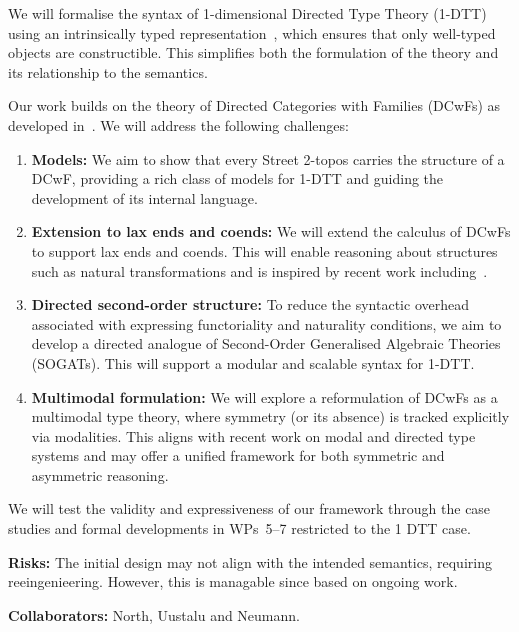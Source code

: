 \documentclass[a4paper,11pt]{article}
\begin{document}
We will formalise the syntax of 1-dimensional Directed Type Theory
(1-DTT) using an intrinsically typed
representation~\cite{altenkirch2016type}, which ensures that only
well-typed objects are constructible. This simplifies both the
formulation of the theory and its relationship to the semantics. 

Our work builds on the theory of Directed Categories with Families
(DCwFs) as developed in~\cite{altenkirch_neumann_2024}. We will address the
following challenges: 

\begin{enumerate}
\item \textbf{Models:} We aim to show that every Street 2-topos carries the structure of a DCwF, providing a rich class of models for 1-DTT and guiding the development of its internal language.

\item \textbf{Extension to lax ends and coends:} We will extend the
  calculus of DCwFs to support lax ends and coends. This will enable
  reasoning about structures such as natural transformations and is
  inspired by recent work including~\cite{north_2019}.  

\item \textbf{Directed second-order structure:} To reduce the
  syntactic overhead associated with expressing functoriality and
  naturality conditions, we aim to develop a directed analogue of
  Second-Order Generalised Algebraic Theories (SOGATs). This will support a modular
  and scalable syntax for 1-DTT. 

\item \textbf{Multimodal formulation:} We will explore a reformulation
  of DCwFs as a multimodal type theory, where symmetry (or its
  absence) is tracked explicitly via modalities. This aligns with
  recent work on modal and directed type systems and may offer a
  unified framework for both symmetric and asymmetric reasoning.
\end{enumerate}

We will test the validity and expressiveness of our 
framework through the case studies and formal developments in
WPs~5--7 restricted to the 1 DTT case.

\textbf{Risks:}
The initial design may not align with the intended semantics,
requiring reeingenieering. However, this is managable since based on
ongoing work.

\textbf{Collaborators:}
North, Uustalu and Neumann.

  
\end{document}
